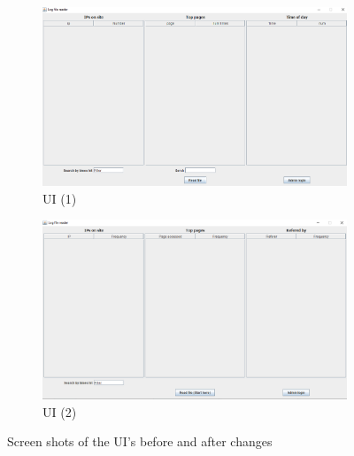 \begin{figure}[H]
  \begin{subfigure}[b]{\textwidth}
    \includegraphics[width=\textwidth]{Apdenix/ui1.PNG}
    \caption{UI (1)}
    \label{fig:1}
  \end{subfigure}
  \begin{subfigure}[b]{\textwidth}
    \includegraphics[width=\textwidth]{Apdenix/ui2.PNG}
    \caption{UI (2)}
    \label{fig:2}
  \end{subfigure}
  \caption{Screen shots of the UI's before and after changes}
\end{figure}
